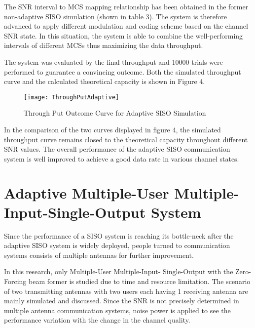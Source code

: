 \documentclass[journal,comsoc]{IEEEtran}
\begin{document}
The SNR interval to MCS mapping relationship has been obtained in the former non-adaptive SISO simulation (shown in table 3). The system is therefore advanced to apply different modulation and coding scheme based on the channel SNR state. In this situation, the system is able to combine the well-performing intervals of different MCSs thus maximizing the data throughput.

The system was evaluated by the final throughput and 10000 trials were performed to guarantee a convincing outcome. Both the simulated throughput curve and the calculated theoretical capacity is shown in Figure 4.
\begin{figure}[!h]
    \centering
    \captionsetup{justification=centering}
    \label{fig_parabola}
	\texttt{[image: ThroughPutAdaptive]}
	\centering
	\caption{Through Put Outcome Curve for Adaptive SISO Simulation}
\end{figure}

In the comparison of the two curves displayed in figure 4, the simulated throughput curve remains closed to the theoretical capacity throughout different SNR values. The overall performance of the adaptive SISO communication system is well improved to achieve a good data rate in various channel states.
\section{Adaptive Multiple-User Multiple-Input-Single-Output System}
Since the performance of a SISO system is reaching its bottle-neck after the adaptive SISO system is widely deployed, people turned to communication systems consists of multiple antennas for further improvement.

In this research, only Multiple-User Multiple-Input- Single-Output with the Zero-Forcing beam former is studied due to time and resource limitation. The scenario of two transmitting antennas with two users each having 1 receiving antenna are mainly simulated and discussed. Since the SNR is not precisely determined in multiple antenna communication systems, noise power is applied to see the performance variation with the change in the channel quality.
\end{document}
